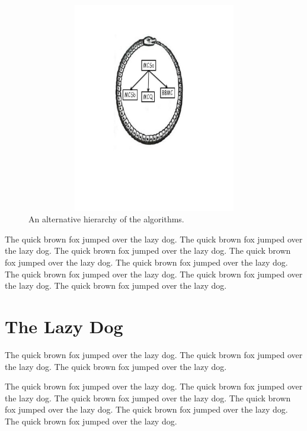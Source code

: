 \documentclass{l4proj}
\begin{document}
\begin{figure}
\centering
\includegraphics[height=9.2cm,width=13.2cm]{uroboros.pdf}
\vspace{-30mm}
\caption{An alternative hierarchy of the algorithms.}
\label{uroborus}
\end{figure}

The quick brown fox jumped over the lazy dog.
The quick brown fox jumped over the lazy dog.
The quick brown fox jumped over the lazy dog.
The quick brown fox jumped over \cite{ckt} the lazy dog.
The quick brown fox jumped over the lazy dog.
The quick brown fox jumped over the lazy dog.
The quick brown fox jumped over the lazy dog.
The quick brown fox jumped over the lazy dog.

\section{The Lazy Dog}
The quick brown fox jumped over the lazy dog.
The quick brown fox jumped over the lazy dog.
The quick brown fox jumped over the lazy dog.

The quick brown fox jumped over the lazy dog.
The quick brown fox \cite{am97} jumped over the lazy dog.
The quick brown fox jumped over the lazy dog.
The quick brown fox jumped over the lazy dog.
The quick brown fox jumped over the lazy dog.
The quick brown fox jumped over the lazy dog.
\end{document}
